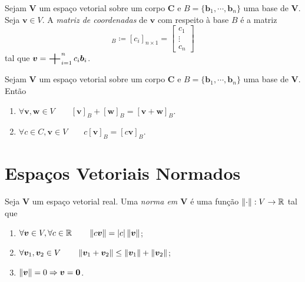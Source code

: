 \begin{defi}
	Sejam $\bm V$ um espaço vetorial sobre um corpo $\bm C$ e $B=\{\bm b_1,\cdots,\bm b_n\}$ uma base de $\bm V$. Seja $\bm v \in V$. A \emph{matriz de coordenadas} de $\bm v$ com respeito à base $B$ é a matriz
	\begin{equation*}
	[\bm v]_B \coloneqq [c_i]_{n \times 1} =
	\begin{bmatrix}
	c_1 \\
	\vdots \\
	c_n
	\end{bmatrix}
	\end{equation*}
tal que $\bm v = \bigsum_{i=1}^n c_i \bm b_i$.
\end{defi}

\begin{prop}
	Sejam $\bm V$ um espaço vetorial sobre um corpo $\bm C$ e $B=\{\bm b_1,\cdots,\bm b_n\}$ uma base de $\bm V$. Então
	\begin{enumerate}
	\item $\forall \bm v,\bm w \in V \qquad [\bm v]_B+[\bm w]_B = [\bm v + \bm w]_B$.
	\item $\forall c \in C, \bm v \in V \qquad c[\bm v]_B=[c\bm v]_B$.
	\end{enumerate}
\end{prop}








































\newpage

\section{Espaços Vetoriais Normados}

\begin{defi}
	Seja $\bm V$ um espaço vetorial real. Uma \emph{norma em $\bm V$} é uma função $\left\Vert{\cdot}\right\Vert: V \to \mathbb{R}$ tal que
	\begin{enumerate}
	\item $\forall \bm v \in V, \forall c \in \mathbb{R} \qquad \left\Vert{c \bm v}\right\Vert = |c|\left\Vert{\bm v}\right\Vert$;
	\item $\forall \bm v_1, \bm v_2 \in V \qquad \left\Vert{\bm v_1 + \bm v_2}\right\Vert \leq \left\Vert{\bm v_1}\right\Vert + \left\Vert{\bm v_2}\right\Vert$;
	\item $\left\Vert{\bm v}\right\Vert = 0 \Rightarrow \bm v = \bm 0$.
	\end{enumerate}
\end{defi}

